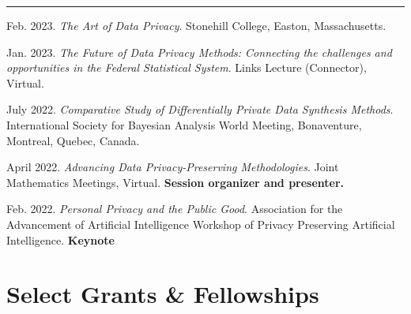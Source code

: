 \documentclass[11pt, letterpaper, roman]{moderncv} %
\begin{document}
\rule{\textwidth}{0.1pt}
\begin{etaremune}[topsep=0pt, itemsep=4pt, partopsep=0pt, parsep=0pt]
\smallskip
    
    \item Feb. 2023. \textit{The Art of Data Privacy}. Stonehill College, Easton, Massachusetts.
    
    \item Jan. 2023. \textit{The Future of Data Privacy Methods: Connecting the challenges and opportunities in the Federal Statistical System}. Links Lecture (Connector), Virtual.

    \item July 2022. \textit{Comparative Study of Differentially Private Data Synthesis Methods}. International Society for Bayesian Analysis World Meeting, Bonaventure, Montreal, Quebec, Canada.

    \item April 2022. \textit{Advancing Data Privacy-Preserving Methodologies}. Joint Mathematics Meetings, Virtual. \textbf{Session organizer and presenter.}
    
    \item Feb. 2022. \textit{Personal Privacy and the Public Good}. Association for the Advancement of Artificial Intelligence Workshop of Privacy Preserving Artificial Intelligence. \textbf{Keynote}
  
\end{etaremune}

\section{Select Grants \&  Fellowships}
\end{document}
